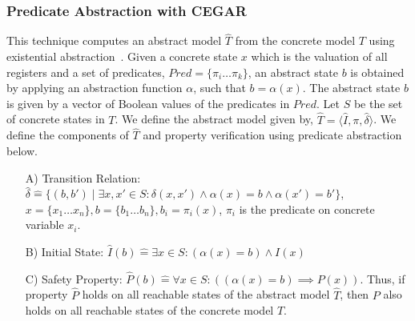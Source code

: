 \subsubsection{Predicate Abstraction with CEGAR}
%
This technique computes an abstract model $\hat{T}$ from the concrete model
$T$ using existential abstraction~\cite{cav97,cav2000}. 
%
Given a concrete state $x$ which is the 
valuation of all registers and a set of 
predicates, $Pred=\{\pi_{i} \ldots \pi_{k}\}$, 
an abstract state $b$ is obtained by applying 
an abstraction function $\alpha$, such that $b=\alpha(x)$.  
%
The abstract state $b$ is given by a vector 
of Boolean values of the predicates in $Pred$. 
%
Let $S$ be the set of concrete states in $T$. 
%
We define the abstract model given by, 
$\hat{T} = \langle \hat{I}, \pi, \hat{\delta} \rangle$.  
We define the components of $\hat{T}$ and property 
verification using predicate abstraction below. 
%
\begin{enumerate}
\item [A)] Transition Relation: $\hat{\delta} \mathrel{\hat{=}} \{(b,b') \mid \exists x,x' \in S: \delta(x,x') 
\wedge \alpha(x) = b \wedge \alpha(x') = b' \} $, $x=\{x_1 \ldots x_n\}, 
b=\{b_1 \ldots b_n\}, b_i=\pi_{i}(x) $, $\pi_i$ is the predicate on concrete variable $x_i$.

\item [B)] Initial State: $\hat{I}(b) \mathrel{\hat{=}} 
\exists x \in S: (\alpha(x) = b) \wedge I(x)$

\item [C)] Safety Property: $\hat{P}(b) \mathrel{\hat{=}} 
\forall x \in S: ((\alpha(x) = b) \implies P(x))$.  
Thus, if property $\hat{P}$ holds on all reachable states of the abstract model $\hat{T}$, then $P$ also holds on all reachable states of the concrete model $T$.
\end{enumerate}

